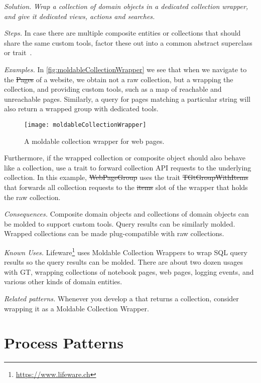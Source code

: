 \documentclass[acmsmall,screen,authorversion,nonacm]{acmart} %
\newcommand{\patref}[1]{\emph{\nameref{pat:#1}}\xspace}
\newcommand{\patsec}[1]{\noindent\textit{#1.}\xspace}
\begin{document}
\patsec{Solution}
\emph{Wrap a collection of domain objects in a dedicated collection wrapper, and give it dedicated views, actions and searches.}

\patsec{Steps}
In case there are multiple composite entities or collections that should share the same custom tools, factor these out into a common abstract superclass or trait~\cite{Duca06b}.

\patsec{Examples}
In \autoref{fig:moldableCollectionWrapper} we see that when we navigate to the \st{Pages} of a website, we obtain not a raw collection, but a  wrapping the collection, and providing custom tools, such as a map of reachable and unreachable pages.
Similarly, a query for pages matching a particular string will also return a wrapped group with dedicated tools.

\begin{figure}[h]
  \texttt{[image: moldableCollectionWrapper]}
  \caption{A moldable collection wrapper for web pages.}
  \label{fig:moldableCollectionWrapper}
\end{figure}

Furthermore, if the wrapped collection or composite object should also behave like a collection, use a trait to forward collection API requests to the underlying collection.
In this example, \st{WebPageGroup} uses the trait \st{TGtGroupWithItems} that forwards all collection requests to the \st{items} slot of the wrapper that holds the raw collection.

\patsec{Consequences}
Composite domain objects and collections of domain objects can be molded to support custom tools.
Query results can be similarly molded.\\
Wrapped collections can be made plug-compatible with raw collections.

\patsec{Known Uses}
Lifeware\footnote{\url{https://www.lifeware.ch}} uses Moldable Collection Wrappers to wrap SQL query results so the query results can be molded.
There are about two dozen usages with GT, wrapping collections of notebook pages, web pages, logging events, and various other kinds of domain entities.

\patsec{Related patterns}
Whenever you develop a \patref{CustomSearch} that returns a collection, consider wrapping it as a Moldable Collection Wrapper.

\section{Process Patterns}\label{sec:process}
\end{document}
